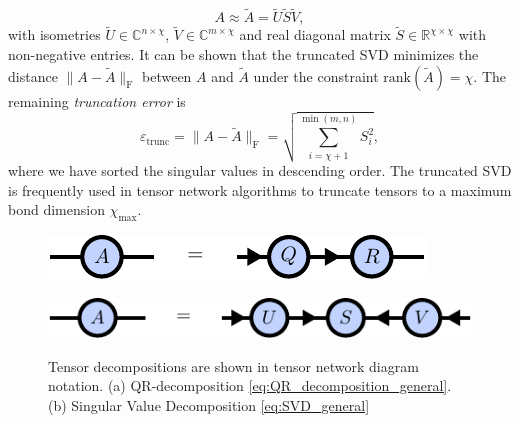 \begin{equation}
	\label{eq:truncated_SVD_general}
	A \approx \tilde{A} = \tilde{U}\tilde{S}\tilde{V},
\end{equation}
with isometries $\tilde{U}\in\mathbb{C}^{n\times\chi}$, $\tilde{V}\in\mathbb{C}^{m\times\chi}$ and real diagonal matrix $\tilde{S}\in\mathbb{R}^{\chi\times\chi}$ with non-negative entries. It can be shown \cite{cite:eckart_young_theorem} that the truncated SVD minimizes the distance $\lVert A - \tilde{A} \rVert_\text{F}$ between $A$ and $\tilde{A}$ under the constraint $\text{rank}(\tilde{A}) = \chi$. The remaining \textit{truncation error} is
\begin{equation}
	\varepsilon_\text{trunc} = \lVert A - \tilde{A} \rVert_\text{F} = \sqrt{\sum_{i=\chi+1}^{\min(m,n)} S_i^2},
\end{equation} 
where we have sorted the singular values in descending order. The truncated SVD is frequently used in tensor network algorithms to truncate tensors to a maximum bond dimension $\chi_\text{max}$. \par
\begin{figure}
	\centering
	\begin{subfigure}[c]{0.1\textwidth}
		\caption{}\label{fig:tensor_decomposition_qr}
	\end{subfigure}%
	\begin{minipage}[c]{0.6\textwidth}
		\raisebox{-26pt}
		{%
			\includegraphics[scale=1]{figures/tikz/Tensor_Networks/tensor_decompositions/tensor_decompositions_a.pdf}
		}
	\end{minipage}
	\par\medskip
	\begin{subfigure}[c]{0.1\textwidth}
		\caption{}\label{fig:tensor_decomposition_svd}
	\end{subfigure}%
	\begin{minipage}[c]{0.6\textwidth}
		\raisebox{-26pt}
		{%
			\includegraphics[scale=1]{figures/tikz/Tensor_Networks/tensor_decompositions/tensor_decompositions_b.pdf}
		}
	\end{minipage}
	\caption{Tensor decompositions are shown in tensor network diagram notation. (a) QR-decomposition \eqref{eq:QR_decomposition_general}. (b) Singular Value Decomposition \eqref{eq:SVD_general}}
	\label{fig:tensor_decomposition_diagrams}
\end{figure}
